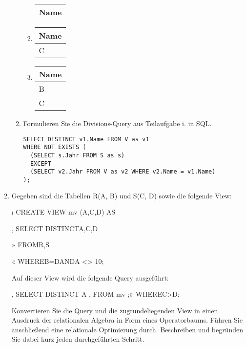 \documentclass{bschlangaul-aufgabe}
\begin{document}
\begin{enumerate}
\begin{enumerate}
\begin{bAntwort}
\begin{enumerate}
\begin{tabular}{|l|}
\hline
Name \\\hline\hline
\end{tabular}

\item

\begin{tabular}{|l|}
\hline
Name \\\hline\hline
C \\\hline
\end{tabular}

\item

\begin{tabular}{|l|}
\hline
Name \\\hline\hline
B \\\hline
C \\\hline
\end{tabular}
\end{enumerate}
\end{bAntwort}


\item Formulieren Sie die Divisions-Query aus Teilaufgabe i. in SQL.

\begin{verbatim}
SELECT DISTINCT v1.Name FROM V as v1
WHERE NOT EXISTS (
  (SELECT s.Jahr FROM S as s)
  EXCEPT
  (SELECT v2.Jahr FROM V as v2 WHERE v2.Name = v1.Name)
);
\end{verbatim}

\end{enumerate}


\item Gegeben sind die Tabellen R(A, B) und S(C, D) sowie die folgende View:

ı CREATE VIEW mv (A,C,D) AS

, SELECT DISTINCTA,C,D

»  FROMR,S

« WHEREB=DANDA <> 10;

Auf dieser View wird die folgende Query ausgeführt:

, SELECT DISTINCT A
, FROM mv
;» WHEREC>D:

Konvertieren Sie die Query und die zugrundeliegenden View in einen
Ausdruck der relationalen Algebra in Form eines Operatorbaums. Führen
Sie anschließend eine relationale Optimierung durch. Beschreiben und
begründen Sie dabei kurz jeden durchgeführten Schritt.


\end{enumerate}
\end{document}
